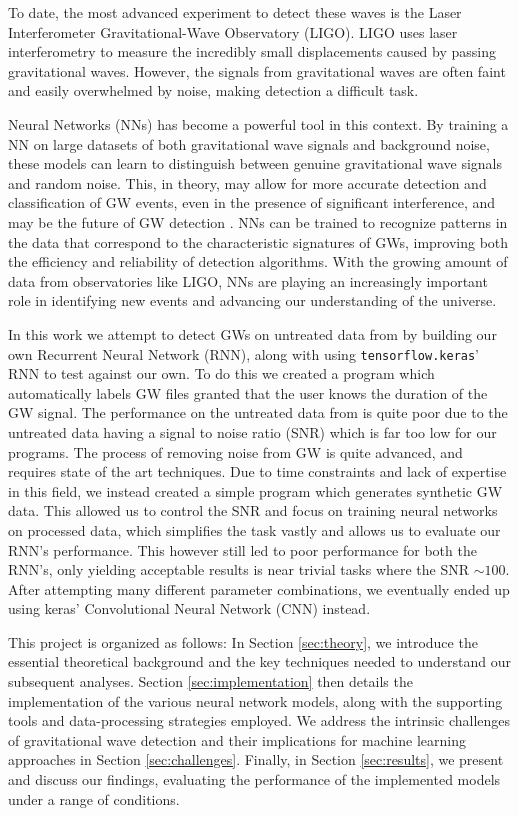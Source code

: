 \documentclass[%
reprint,
amsmath,amssymb,
aps,
]{revtex4-2}
\begin{document}
To date, the most advanced experiment to detect these waves is the Laser Interferometer Gravitational-Wave Observatory (LIGO). LIGO uses laser interferometry to measure the incredibly small displacements caused by passing gravitational waves. However, the signals from gravitational waves are often faint and easily overwhelmed by noise, making detection a difficult task.

Neural Networks (NNs) has become a powerful tool in this context. By training a NN on large datasets of both gravitational wave signals and background noise, these models can learn to distinguish between genuine gravitational wave signals and random noise. This, in theory, may allow for more accurate detection and classification of GW events, even in the presence of significant interference, and may be the future of GW detection \cite{Marx:2024wjt, skliris2024}. NNs can be trained to recognize patterns in the data that correspond to the characteristic signatures of GWs, improving both the efficiency and reliability of detection algorithms. With the growing amount of data from observatories like LIGO, NNs are playing an increasingly important role in identifying new events and advancing our understanding of the universe.

In this work we attempt to detect GWs on untreated data from \cite{gwosc} by building our own Recurrent Neural Network (RNN), along with using \texttt{tensorflow.keras}' RNN to test against our own. To do this we created a program which automatically labels GW files granted that the user knows the duration of the GW signal. The performance on the untreated data from \cite{gwosc} is quite poor due to the untreated data having a signal to noise ratio (SNR) which is far too low for our programs. The process of removing noise from GW is quite advanced, and requires state of the art techniques. Due to time constraints and lack of expertise in this field, we instead created a simple program which generates synthetic GW data. This allowed us to control the SNR and focus on training neural networks on processed data, which simplifies the task vastly and allows us to evaluate our RNN's performance. This however still led to poor performance for both the RNN's, only yielding acceptable results is near trivial tasks where the SNR $\sim100$. After attempting many different parameter combinations, we eventually ended up using keras' Convolutional Neural Network (CNN) instead.

This project is organized as follows: In Section \ref{sec:theory}, we introduce the essential theoretical background and the key techniques needed to understand our subsequent analyses. Section \ref{sec:implementation} then details the implementation of the various neural network models, along with the supporting tools and data-processing strategies employed. We address the intrinsic challenges of gravitational wave detection and their implications for machine learning approaches in Section \ref{sec:challenges}. Finally, in Section \ref{sec:results}, we present and discuss our findings, evaluating the performance of the implemented models under a range of conditions.
\end{document}
